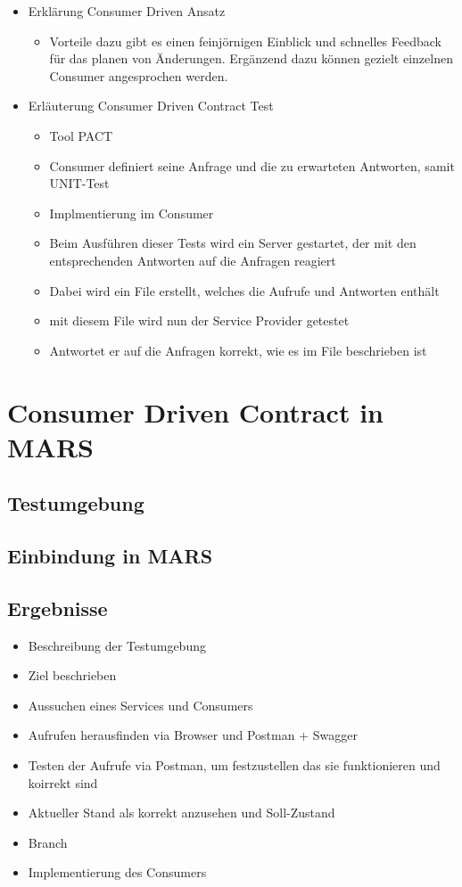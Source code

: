 \documentclass{llncs}
\begin{document}
\begin{itemize}
\item Erklärung Consumer Driven Ansatz
\begin{itemize}

\item Vorteile dazu gibt es einen feinjörnigen Einblick und schnelles Feedback für das planen von Änderungen. Ergänzend dazu können gezielt einzelnen Consumer angesprochen werden.
\end{itemize}
\item Erläuterung Consumer Driven Contract Test
\begin{itemize}
\item Tool PACT
\item Consumer definiert seine Anfrage und die zu erwarteten Antworten, samit UNIT-Test
\item Implmentierung im Consumer
\item Beim Ausführen dieser Tests wird ein Server gestartet, der mit den entsprechenden Antworten auf die Anfragen reagiert
\item Dabei wird ein File erstellt, welches die Aufrufe und Antworten enthält
\item mit diesem File wird nun der Service Provider getestet
\item Antwortet er auf die Anfragen korrekt, wie es im File beschrieben ist

\end{itemize}
\end{itemize}


\section{Consumer Driven Contract in MARS}

\subsection{Testumgebung}

\subsection{Einbindung in MARS}

\subsection{Ergebnisse}


\begin{itemize}
\item Beschreibung der Testumgebung
\item Ziel beschrieben
\item Aussuchen eines Services und Consumers
\item Aufrufen herausfinden via Browser und Postman + Swagger
\item Testen der Aufrufe via Postman, um festzustellen das sie funktionieren und koirrekt sind
\item Aktueller Stand als korrekt anzusehen und Soll-Zustand
\item Branch
\item Implementierung des Consumers
\end{itemize}
\end{document}
